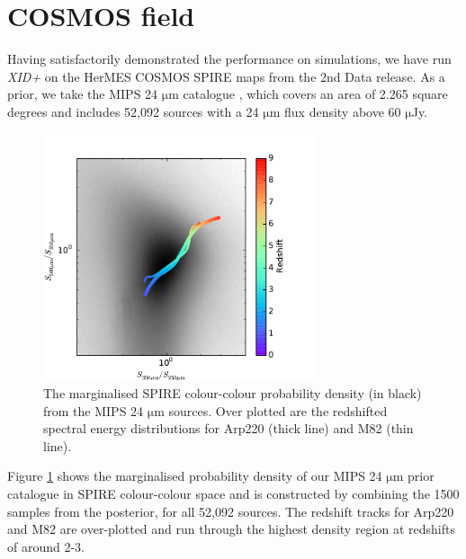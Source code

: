 \documentclass[useAMS,usenatbib]{mnras}
\begin{document}
\section{COSMOS field}\label{sec:COSMOS}
Having satisfactorily demonstrated the performance on simulations, we have run \emph{XID+} on the HerMES COSMOS SPIRE maps from the 2nd Data release. As a prior, we take the MIPS 24 $\mathrm{\mu m}$ catalogue \citep{LeFLoch:2009}, which covers an area of 2.265 square degrees and includes 52,092 sources with a 24 $\mathrm{\mu m}$ flux density above 60 $\mathrm{\mu}$Jy.
\begin{figure} 
\includegraphics[width=8cm,page={1}]{colour_colour.pdf}
\caption{The marginalised SPIRE colour-colour probability density (in black) from the MIPS 24 $\mathrm{\mu m}$ sources. Over plotted are the redshifted spectral energy distributions for Arp220 (thick line) and M82 (thin line)\protect\citep{Polletta:2007}.}\label{fig:col-col}
\end{figure}
Figure \ref{fig:col-col} shows the marginalised probability density of our MIPS 24 $\mathrm{\mu m}$ prior catalogue in SPIRE colour-colour space and is  constructed by combining the 1500 samples from the posterior, for all 52,092 sources. The redshift tracks for Arp220 and M82 are over-plotted and run through the highest density region at redshifts of around 2-3.
\end{document}
